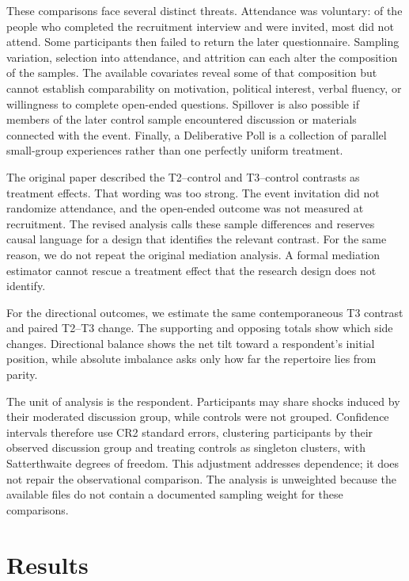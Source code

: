 \documentclass{article}
\begin{document}
These comparisons face several distinct threats. Attendance was voluntary: of the people who
completed the recruitment interview and were invited, most did not attend. Some participants
then failed to return the later questionnaire. Sampling variation, selection into attendance,
and attrition can each alter the composition of the samples. The available covariates reveal
some of that composition but cannot establish comparability on motivation, political interest,
verbal fluency, or willingness to complete open-ended questions. Spillover is also possible if
members of the later control sample encountered discussion or materials connected with the
event. Finally, a Deliberative Poll is a collection of parallel small-group experiences rather
than one perfectly uniform treatment.

The original paper described the T2--control and T3--control contrasts as treatment effects.
That wording was too strong. The event invitation did not randomize attendance, and the
open-ended outcome was not measured at recruitment. The revised analysis calls these sample
differences and reserves causal language for a design that identifies the relevant contrast.
For the same reason, we do not repeat the original mediation analysis. A formal mediation
estimator \citep{imai2010general} cannot rescue a treatment effect that the research design
does not identify.

For the directional outcomes, we estimate the same contemporaneous T3 contrast and paired
T2--T3 change. The supporting and opposing totals show which side changes. Directional balance
shows the net tilt toward a respondent's initial position, while absolute imbalance asks only
how far the repertoire lies from parity.

The unit of analysis is the respondent. Participants may share shocks induced by their
moderated discussion group, while controls were not grouped. Confidence intervals therefore
use CR2 standard errors, clustering participants by their observed discussion group and
treating controls as singleton clusters, with Satterthwaite degrees of freedom. This
adjustment addresses dependence; it does not repair the observational comparison. The analysis
is unweighted because the available files do not contain a documented sampling weight for
these comparisons.

\section{Results}
\end{document}
